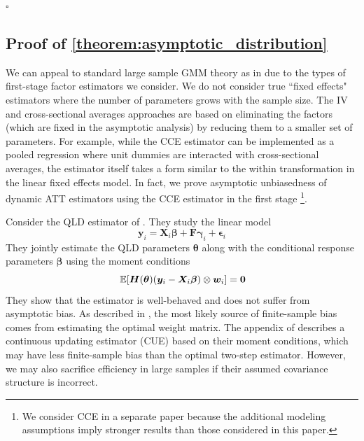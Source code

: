 \documentclass[12pt]{article}
\newcommand{\nick}[1]{\coauthorComment[Nick]{#1}}
\begin{document}
$\square$

\subsection*{Proof of \autoref{theorem:asymptotic_distribution}}


We can appeal to standard large sample GMM theory as in \citet{Hansen_1982} due to the types of first-stage factor estimators we consider. We do not consider true ``fixed effects" estimators where the number of parameters grows with the sample size. The IV and cross-sectional averages approaches are based on eliminating the factors (which are fixed in the asymptotic analysis) by reducing them to a smaller set of parameters. For example, while the CCE estimator can be implemented as a pooled regression where unit dummies are interacted with cross-sectional averages, the estimator itself takes a form similar to the within transformation in the linear fixed effects model. In fact, we prove asymptotic unbiasedness of dynamic ATT estimators using the CCE estimator in the first stage \citep{Brown_Butts_Westerlund_2023}\footnote{We consider CCE in a separate paper because the additional modeling assumptions imply stronger results than those considered in this paper.}.

Consider the QLD estimator of \citet{Ahn_Lee_Schmidt_2013}. They study the linear model
\begin{equation}
    \bm y_i = \bm X_i \bm \beta + \bm F \bm \gamma_i + \bm \epsilon_i
\end{equation}
They jointly estimate the QLD parameters $\bm \theta$ along with the conditional response parameters $\bm \beta$ using the moment conditions
\begin{equation}
    \expec{\bm H(\bm \theta) (\bm y_i - \bm X_i \bm \beta) \otimes \bm w_i} = \bm 0
\end{equation}
They show that the estimator is well-behaved and does not suffer from asymptotic bias. As described in \citet{windmeijer2005finite}, the most likely source of finite-sample bias comes from estimating the optimal weight matrix. The appendix of \citet{Ahn_Lee_Schmidt_2013} describes a continuous updating estimator (CUE) based on their moment conditions, which may have less finite-sample bias than the optimal two-step estimator. However, we may also sacrifice efficiency in large samples if their assumed covariance structure is incorrect. 
\end{document}
